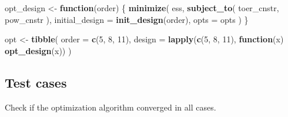 \documentclass[]{book}
\newenvironment{Shaded}{\begin{snugshade}}{\end{snugshade}}
\newcommand{\ControlFlowTok}[1]{\textcolor[rgb]{0.13,0.29,0.53}{\textbf{#1}}}
\newcommand{\DataTypeTok}[1]{\textcolor[rgb]{0.13,0.29,0.53}{#1}}
\newcommand{\DecValTok}[1]{\textcolor[rgb]{0.00,0.00,0.81}{#1}}
\newcommand{\KeywordTok}[1]{\textcolor[rgb]{0.13,0.29,0.53}{\textbf{#1}}}
\newcommand{\NormalTok}[1]{#1}
\newcommand{\OperatorTok}[1]{\textcolor[rgb]{0.81,0.36,0.00}{\textbf{#1}}}
\newcommand{\StringTok}[1]{\textcolor[rgb]{0.31,0.60,0.02}{#1}}
\begin{document}
\begin{Shaded}
\begin{Highlighting}[]
\NormalTok{opt_design <-}\StringTok{ }\ControlFlowTok{function}\NormalTok{(order) \{}
    \KeywordTok{minimize}\NormalTok{(}
\NormalTok{        ess,}
        \KeywordTok{subject_to}\NormalTok{(}
\NormalTok{            toer_cnstr,}
\NormalTok{            pow_cnstr}
\NormalTok{        ),}
        \DataTypeTok{initial_design =} \KeywordTok{init_design}\NormalTok{(order),}
        \DataTypeTok{opts =}\NormalTok{ opts}
\NormalTok{    )}
\NormalTok{\}}

\NormalTok{opt <-}\StringTok{ }\KeywordTok{tibble}\NormalTok{(}
  \DataTypeTok{order  =} \KeywordTok{c}\NormalTok{(}\DecValTok{5}\NormalTok{, }\DecValTok{8}\NormalTok{, }\DecValTok{11}\NormalTok{),}
  \DataTypeTok{design =} \KeywordTok{lapply}\NormalTok{(}\KeywordTok{c}\NormalTok{(}\DecValTok{5}\NormalTok{, }\DecValTok{8}\NormalTok{, }\DecValTok{11}\NormalTok{), }\ControlFlowTok{function}\NormalTok{(x) }\KeywordTok{opt_design}\NormalTok{(x))}
\NormalTok{)}
\end{Highlighting}
\end{Shaded}

\hypertarget{test-cases-10}{%
\subsection{Test cases}\label{test-cases-10}}

Check if the optimization algorithm converged in all cases.

\begin{Shaded}
\end{Shaded}
\end{document}
